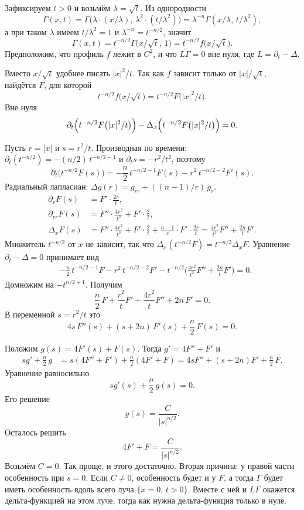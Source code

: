 \documentclass[12pt,a4paper]{article}
\begin{document}
Зафиксируем \(t>0\) и возьмём \(\lambda=\sqrt{t}\).
Из однородности
\[
\Gamma(x,t)
=
\Gamma\bigl(\lambda\cdot(x/\lambda),\,\lambda^2\cdot(t/\lambda^2)\bigr)
=
\lambda^{-n}
\Gamma(x/\lambda,\,t/\lambda^2),
\]
а при таком \(\lambda\) имеем \(t/\lambda^2=1\) и \(\lambda^{-n}=t^{-n/2}\), значит
\[
\Gamma(x,t)
=
t^{-n/2}
\Gamma\bigl(x/\sqrt{t},\,1\bigr)
=
t^{-n/2}
f\bigl(x/\sqrt{t}\bigr).
\]
Предположим, что профиль \(f\) лежит в \(C^2\),
и что \(L\Gamma=0\) вне нуля, где \(L=\partial_t-\Delta\).

Вместо \(x/\sqrt{t}\) удобнее писать \(|x|^2/t\).
Так как \(f\) зависит только от \(|x|/\sqrt{t}\), найдётся \(F\), для которой
\[
t^{-n/2}f\bigl(x/\sqrt{t}\bigr)
=
t^{-n/2}F\bigl(|x|^2/t\bigr).
\]
Вне нуля
\[
\partial_t
\Bigl(
    t^{-n/2}F\bigl(|x|^2/t\bigr)
\Bigr)
-
\Delta_x
\Bigl(
    t^{-n/2}F\bigl(|x|^2/t\bigr)
\Bigr)
=0.
\]

Пусть \(r=|x|\) и \(s=r^2/t\).
Производная по времени:
\(\partial_t(t^{-n/2})=-(n/2)\,t^{-n/2-1}\) и
\(\partial_t s=-r^2/t^2\), поэтому
\[
\partial_t\bigl(t^{-n/2}F(s)\bigr)
=
-\frac n2\,t^{-n/2-1}F(s)
-
r^2\,t^{-n/2-2}F'(s).
\]
Радиальный лапласиан:
\(\Delta g(r)=g_{rr}+((n-1)/r)\,g_r\).
\begin{align*}
\partial_r F(s)
&=
F'\cdot\frac{2r}{t},
\\
\partial_{rr} F(s)
&=
F''\cdot\frac{4r^2}{t^2}
+
F'\cdot\frac{2}{t},
\\
\Delta_x F(s)
&=
F''\cdot\frac{4r^2}{t^2}
+
F'\cdot\frac{2}{t}
+
\frac{n-1}{r}
\cdot
F'\cdot\frac{2r}{t}
=
\frac{4r^2}{t^2}F''
+
\frac{2n}{t}F'.
\end{align*}
Множитель \(t^{-n/2}\) от \(x\) не зависит, так что
\(\Delta_x(t^{-n/2}F)=t^{-n/2}\Delta_x F\).
Уравнение \(\partial_t-\Delta=0\) принимает вид
\begin{align*}
&-\frac n2\,t^{-n/2-1}F
-
r^2\,t^{-n/2-2}F'
-
t^{-n/2}
\Biggl(
    \frac{4r^2}{t^2}F''
    +
    \frac{2n}{t}F'
\Biggr)
=0.
\end{align*}
Домножим на \(-t^{n/2+1}\).
Получим
\[
\frac n2\,F
+
\frac{r^2}{t}F'
+
\frac{4r^2}{t}F''
+
2n\,F'
=0.
\]
В переменной \(s=r^2/t\) это
\[
4s\,F''(s)
+
(s+2n)\,F'(s)
+
\frac n2\,F(s)
=0.
\]

Положим \(g(s)=4F'(s)+F(s)\). Тогда \(g'=4F''+F'\) и
\begin{align*}
sg'+\frac n2\,g
&=
s(4F''+F')
+
\frac n2(4F'+F)
=
4s F''
+
(s+2n)F'
+
\frac n2\,F.
\end{align*}
Уравнение равносильно
\[
sg'(s)+\frac n2\,g(s)=0.
\]
Его решение
\[
g(s)=\frac{C}{|s|^{n/2}}.
\]
Осталось решить
\[
4F'+F=\frac{C}{|s|^{n/2}}.
\]
Возьмём \(C=0\).
Так проще, и этого достаточно.
Вторая причина: у правой части особенность при \(s=0\).
Если \(C\neq 0\), особенность будет и у \(F\),
а тогда \(\Gamma\) будет иметь особенность вдоль всего луча \(\{x=0,\,t>0\}\).
Вместе с ней и \(L\Gamma\) окажется дельта-функцией на этом луче,
тогда как нужна дельта-функция только в нуле.
\end{document}
